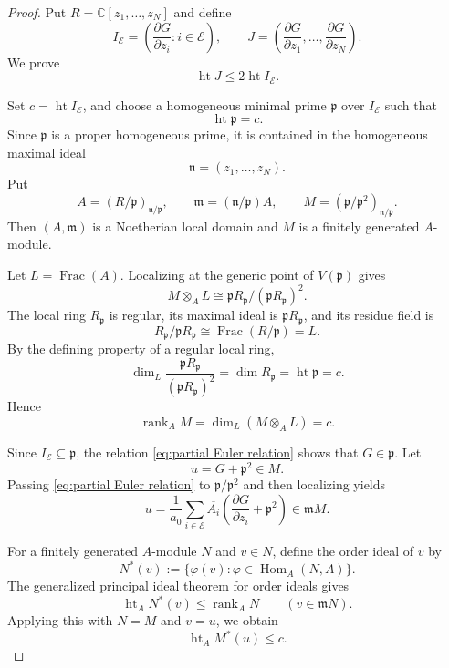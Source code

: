 \documentclass[12pt,reqno]{amsart}
\theoremstyle{definition}
\theoremstyle{remark}
\numberwithin{equation}{section}
\def\C{{\mathbb C}}\def\D{{\mathbb D}}
\begin{document}
\begin{proof}
    Put $R=\C[z_1,\ldots,z_N]$ and define
    \[
    I_{\mathcal E}=
    \left(\frac{\partial G}{\partial z_i}:i\in\mathcal E\right),
    \qquad
    J=\left(
        \frac{\partial G}{\partial z_1},\ldots,
        \frac{\partial G}{\partial z_N}
    \right).
    \]
    We prove
    \[
    \operatorname{ht}J\leq 2\operatorname{ht}I_{\mathcal E}.
    \]

    Set $c=\operatorname{ht}I_{\mathcal E}$, and choose a homogeneous
    minimal prime $\mathfrak p$ over $I_{\mathcal E}$ such that
    \[
    \operatorname{ht}\mathfrak p=c.
    \]
    Since $\mathfrak p$ is a proper homogeneous prime, it is contained in
    the homogeneous maximal ideal
    \[
    \mathfrak n=(z_1,\ldots,z_N).
    \]
    Put
    \[
    A=(R/\mathfrak p)_{\mathfrak n/\mathfrak p},
    \qquad
    \mathfrak m=(\mathfrak n/\mathfrak p)A,
    \qquad
    M=(\mathfrak p/\mathfrak p^2)_{\mathfrak n/\mathfrak p}.
    \]
    Then $(A,\mathfrak m)$ is a Noetherian local domain and $M$ is a
    finitely generated $A$-module.

    Let $L=\operatorname{Frac}(A)$. Localizing at the generic point of
    $V(\mathfrak p)$ gives
    \[
    M\otimes_A L
    \cong
    \mathfrak pR_{\mathfrak p}/(\mathfrak pR_{\mathfrak p})^2.
    \]
    The local ring $R_{\mathfrak p}$ is regular, its maximal ideal is
    $\mathfrak pR_{\mathfrak p}$, and its residue field is
    \[
    R_{\mathfrak p}/\mathfrak pR_{\mathfrak p}
    \cong \operatorname{Frac}(R/\mathfrak p)=L.
    \]
    By the defining property of a regular local ring,
    \[
    \dim_L
    \frac{\mathfrak pR_{\mathfrak p}}
    {(\mathfrak pR_{\mathfrak p})^2}
    =\dim R_{\mathfrak p}
    =\operatorname{ht}\mathfrak p
    =c.
    \]
    Hence
    \[
    \operatorname{rank}_A M
    =\dim_L(M\otimes_A L)
    =c.
    \]

    Since $I_{\mathcal E}\subseteq\mathfrak p$, the relation
    \eqref{eq:partial Euler relation} shows that $G\in\mathfrak p$. Let
    \[
    u=G+\mathfrak p^2\in M.
    \]
    Passing \eqref{eq:partial Euler relation} to
    $\mathfrak p/\mathfrak p^2$ and then localizing yields
    \[
    u=
    \frac1{a_0}\sum_{i\in\mathcal E}
    \overline{A_i}
    \left(
        \frac{\partial G}{\partial z_i}+\mathfrak p^2
    \right)
    \in\mathfrak mM.
    \]

    For a finitely generated $A$-module $N$ and $v\in N$, define the order
    ideal of $v$ by
    \[
    N^*(v):=
    \{\varphi(v):\varphi\in\operatorname{Hom}_A(N,A)\}.
    \]
    The generalized principal ideal theorem
    for order ideals \cite[Theorem 2.2]{EisenbudHunekeUlrich2001} gives
    \[
    \operatorname{ht}_A N^*(v)
    \leq \operatorname{rank}_A N
    \qquad (v\in\mathfrak mN).
    \]
    Applying this with $N=M$ and $v=u$, we obtain
    \[
    \operatorname{ht}_A M^*(u)\leq c.
    \]


\end{proof}
\end{document}
